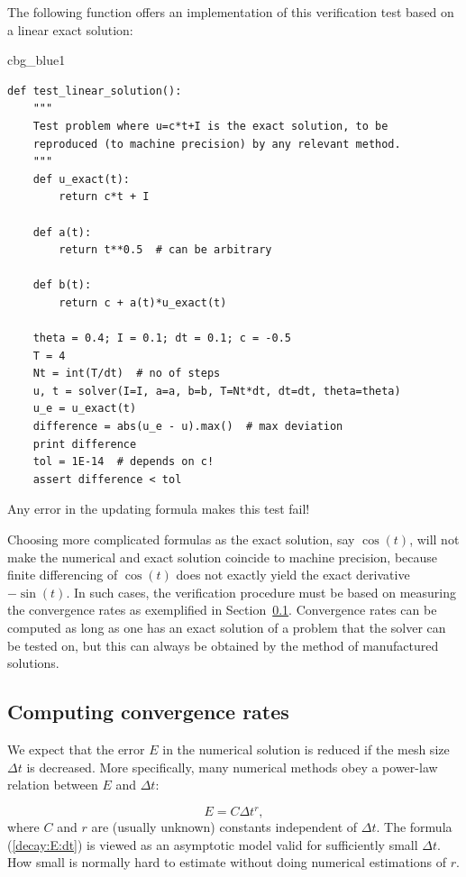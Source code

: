 \documentclass[%
oneside,                 %
final,                   %
10pt]{article}
\newenvironment{_cod_tight}[1]{
   \def\FrameCommand{\colorbox{#1}}
   \FrameRule0.6pt\MakeFramed {\FrameRestore}\vskip3mm}
   {\vskip0mm\endMakeFramed}
\newenvironment{cod}[1]{
\bgroup\rmfamily
\fboxsep=0mm\relax
\begin{_cod_tight}{#1}
\list{}{\parsep=-2mm\parskip=0mm\topsep=0pt\leftmargin=2mm
\rightmargin=2\leftmargin\leftmargin=4pt\relax}
\item\relax}
{\endlist\end{_cod_tight}\egroup}
\begin{document}
The following function offers an implementation of this verification
test based on a linear exact solution:

\begin{cod}{cbg_blue1}\begin{Verbatim}[numbers=none,fontsize=\fontsize{9pt}{9pt},baselinestretch=0.95,xleftmargin=2mm]
def test_linear_solution():
    """
    Test problem where u=c*t+I is the exact solution, to be
    reproduced (to machine precision) by any relevant method.
    """
    def u_exact(t):
        return c*t + I

    def a(t):
        return t**0.5  # can be arbitrary

    def b(t):
        return c + a(t)*u_exact(t)

    theta = 0.4; I = 0.1; dt = 0.1; c = -0.5
    T = 4
    Nt = int(T/dt)  # no of steps
    u, t = solver(I=I, a=a, b=b, T=Nt*dt, dt=dt, theta=theta)
    u_e = u_exact(t)
    difference = abs(u_e - u).max()  # max deviation
    print difference
    tol = 1E-14  # depends on c!
    assert difference < tol
\end{Verbatim}
\end{cod}
\noindent
Any error in the updating formula makes this test fail!

Choosing more complicated formulas as the exact solution, say
$\cos(t)$, will not make the numerical and exact solution
coincide to machine precision, because finite differencing of
$\cos(t)$ does not exactly yield the exact derivative $-\sin(t)$.
In such cases, the verification procedure
must be based on measuring the convergence rates as exemplified in
Section~\ref{decay:convergence:rate}. Convergence rates can be
computed as long as one has
an exact solution of a problem that the solver can be tested on, but
this can always be obtained by the method of manufactured solutions.


\subsection{Computing convergence rates}
\label{decay:convergence:rate}


We expect that the error $E$ in the numerical solution is
reduced if the mesh size $\Delta t$ is decreased. More specifically,
many numerical methods obey a power-law relation between $E$ and
$\Delta t$:

\begin{equation}
E = C\Delta t^r,
\label{decay:E:dt}
\end{equation}
where $C$ and $r$ are (usually unknown) constants independent of $\Delta t$.
The formula (\ref{decay:E:dt}) is viewed as an asymptotic model valid for
sufficiently small $\Delta t$. How small is normally hard to estimate
without doing numerical estimations of $r$.
\end{document}
